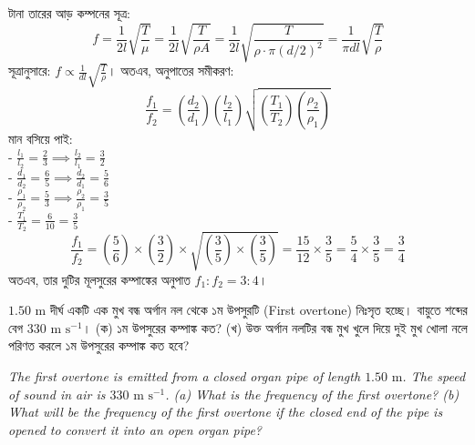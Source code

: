 \documentclass[12pt, a4paper]{article}
\begin{document}
\begin{tcolorbox}[solutionbox={সমাধান (Solution)}]
\noindent
টানা তারের আড় কম্পনের সূত্র:
\[ f = \frac{1}{2l}\sqrt{\frac{T}{\mu}} = \frac{1}{2l}\sqrt{\frac{T}{\rho A}} = \frac{1}{2l}\sqrt{\frac{T}{\rho \cdot \pi (d/2)^2}} = \frac{1}{\pi d l}\sqrt{\frac{T}{\rho}} \]
সূত্রানুসারে: $f \propto \frac{1}{d l}\sqrt{\frac{T}{\rho}}$। অতএব, অনুপাতের সমীকরণ:
\[ \frac{f_1}{f_2} = \left(\frac{d_2}{d_1}\right) \left(\frac{l_2}{l_1}\right) \sqrt{\left(\frac{T_1}{T_2}\right) \left(\frac{\rho_2}{\rho_1}\right)} \]
মান বসিয়ে পাই: \\
- $\frac{l_1}{l_2} = \frac{2}{3} \implies \frac{l_2}{l_1} = \frac{3}{2}$ \\
- $\frac{d_1}{d_2} = \frac{6}{5} \implies \frac{d_2}{d_1} = \frac{5}{6}$ \\
- $\frac{\rho_1}{\rho_2} = \frac{5}{3} \implies \frac{\rho_2}{\rho_1} = \frac{3}{5}$ \\
- $\frac{T_1}{T_2} = \frac{6}{10} = \frac{3}{5}$
\[ \frac{f_1}{f_2} = \left(\frac{5}{6}\right) \times \left(\frac{3}{2}\right) \times \sqrt{\left(\frac{3}{5}\right) \times \left(\frac{3}{5}\right)} = \frac{15}{12} \times \frac{3}{5} = \frac{5}{4} \times \frac{3}{5} = \frac{3}{4} \]
অতএব, তার দুটির মূলসুরের কম্পাঙ্কের অনুপাত $f_1 : f_2 = 3 : 4$।
\end{tcolorbox}

\vspace{1.5em}

\begin{tcolorbox}[questionbox={প্রশ্ন (Question) 7}]
\noindent
$1.50\text{ m}$ দীর্ঘ একটি এক মুখ বন্ধ অর্গান নল থেকে ১ম উপসুরটি (First overtone) নিঃসৃত হচ্ছে। বায়ুতে শব্দের বেগ $330\text{ m s}^{-1}$। (ক) ১ম উপসুরের কম্পাঙ্ক কত? (খ) উক্ত অর্গান নলটির বন্ধ মুখ খুলে দিয়ে দুই মুখ খোলা নলে পরিণত করলে ১ম উপসুরের কম্পাঙ্ক কত হবে?

\vspace{0.8em}
\begin{english}
\noindent\textit{\color{darkgray}
The first overtone is emitted from a closed organ pipe of length $1.50\text{ m}$. The speed of sound in air is $330\text{ m s}^{-1}$. (a) What is the frequency of the first overtone? (b) What will be the frequency of the first overtone if the closed end of the pipe is opened to convert it into an open organ pipe?
}
\end{english}
\end{tcolorbox}
\end{document}
